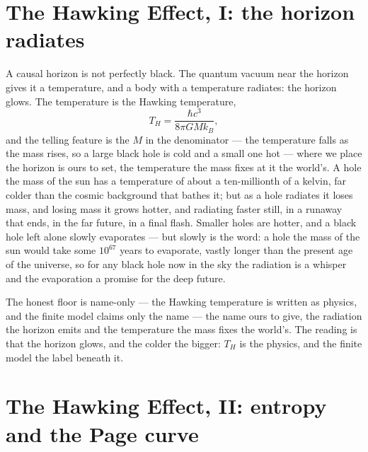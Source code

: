 \section{The Hawking Effect, I: the horizon radiates}
\label{se:hawking-radiation}

A causal horizon is not perfectly black. The quantum vacuum near the horizon gives it a temperature, and a
body with a temperature radiates: the horizon glows. The temperature is the Hawking temperature,
\begin{equation}
  T_H = \frac{\hbar c^3}{8\pi G M k_B},
\end{equation}
and the telling feature is the $M$ in the denominator --- the temperature falls as the mass rises, so a large
black hole is cold and a small one hot --- where we place the horizon is ours to set, the temperature the mass
fixes at it the world's. A hole the mass of the sun has a temperature of about a ten-millionth
of a kelvin, far colder than the cosmic background that bathes it; but as a hole radiates it loses mass, and
losing mass it grows hotter, and radiating faster still, in a runaway that ends, in the far future, in a final
flash. Smaller holes are hotter, and a black hole left alone slowly evaporates --- but slowly is the word: a
hole the mass of the sun would take some $10^{67}$ years to evaporate, vastly longer than the present age of
the universe, so for any black hole now in the sky the radiation is a whisper and the evaporation a promise for
the deep future.

The honest floor is name-only --- the Hawking temperature is written as physics, and the finite model claims
only the name --- the name ours to give, the radiation the horizon emits and the temperature the mass fixes the
world's. The reading is that the horizon glows, and the colder the bigger: $T_H$ is the physics, and the
finite model the label beneath it.

\section{The Hawking Effect, II: entropy and the Page curve}
\label{se:hawking-entropy}

